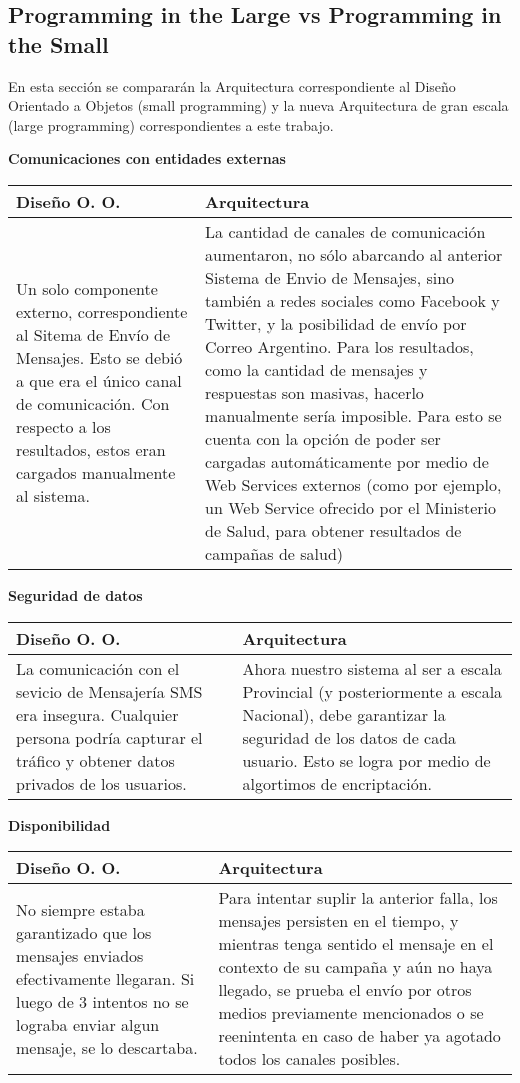 \subsection{Programming in the Large vs Programming in the Small}

En esta secci\'on se comparar\'an la Arquitectura correspondiente al Dise\~no Orientado a Objetos (small programming) y la nueva Arquitectura de gran escala (large programming) correspondientes a este trabajo.

{\bf Comunicaciones con entidades externas} \\
\begin{tabular}{| p{8cm} | p{8cm} |}
\hline
Dise\~no O. O. & Arquitectura \\ \hline \hline
Un solo componente externo, correspondiente al Sitema de Env\'io de Mensajes. Esto se debi\'o a que era el \'unico canal de comunicaci\'on. Con respecto a los resultados, estos eran cargados manualmente al sistema. & La cantidad de canales de comunicaci\'on aumentaron, no s\'olo abarcando al anterior Sistema de Envio de Mensajes, sino tambi\'en a redes sociales como Facebook y Twitter, y la posibilidad de env\'io por Correo Argentino. Para los resultados, como la cantidad de mensajes y respuestas son masivas, hacerlo manualmente ser\'ia imposible. Para esto se cuenta con la opci\'on de poder ser cargadas autom\'aticamente por medio de Web Services externos (como por ejemplo, un Web Service ofrecido por el Ministerio de Salud, para obtener resultados de campa\~nas de salud) \\ \hline
\end{tabular}


{\bf Seguridad de datos} \\
\begin{tabular}{| p{8cm} | p{8cm} |}
\hline
Dise\~no O. O. & Arquitectura \\ \hline \hline

La comunicaci\'on con el sevicio de Mensajer\'ia SMS era insegura. Cualquier persona podr\'ia capturar el tr\'afico y obtener datos privados de los usuarios. & Ahora nuestro sistema al ser a escala Provincial (y posteriormente a escala Nacional), debe garantizar la seguridad de los datos de cada usuario. Esto se logra por medio de algortimos de encriptaci\'on. \\ \hline
\end{tabular}


{\bf Disponibilidad} \\
\begin{tabular}{| p{8cm} | p{8cm} |}
\hline
Dise\~no O. O. & Arquitectura \\ \hline \hline

No siempre estaba garantizado que los mensajes enviados efectivamente llegaran. Si luego de 3 intentos no se lograba enviar algun mensaje, se lo descartaba. & Para intentar suplir la anterior falla, los mensajes persisten en el tiempo, y mientras tenga sentido el mensaje en el contexto de su campa\~na y a\'un no haya llegado, se prueba el env\'io por otros medios previamente mencionados o se reenintenta en caso de haber ya agotado todos los canales posibles. \\ \hline
\end{tabular}

